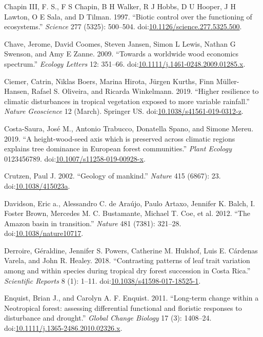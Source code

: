 \documentclass[]{elsarticle} %
\begin{document}
\hypertarget{ref-ChapinIII1997}{}
Chapin III, F. S., F S Chapin, B H Walker, R J Hobbs, D U Hooper, J H
Lawton, O E Sala, and D Tilman. 1997. ``Biotic control over the
functioning of ecosystems.'' \emph{Science} 277 (5325): 500--504.
doi:\href{https://doi.org/10.1126/science.277.5325.500}{10.1126/science.277.5325.500}.

\hypertarget{ref-Chave2009}{}
Chave, Jerome, David Coomes, Steven Jansen, Simon L Lewis, Nathan G
Swenson, and Amy E Zanne. 2009. ``Towards a worldwide wood economics
spectrum.'' \emph{Ecology Letters} 12: 351--66.
doi:\href{https://doi.org/10.1111/j.1461-0248.2009.01285.x}{10.1111/j.1461-0248.2009.01285.x}.

\hypertarget{ref-Ciemer2019}{}
Ciemer, Catrin, Niklas Boers, Marina Hirota, Jürgen Kurths, Finn
Müller-Hansen, Rafael S. Oliveira, and Ricarda Winkelmann. 2019.
``Higher resilience to climatic disturbances in tropical vegetation
exposed to more variable rainfall.'' \emph{Nature Geoscience} 12
(March). Springer US.
doi:\href{https://doi.org/10.1038/s41561-019-0312-z}{10.1038/s41561-019-0312-z}.

\hypertarget{ref-Costa-Saura2019}{}
Costa-Saura, José M., Antonio Trabucco, Donatella Spano, and Simone
Mereu. 2019. ``A height-wood-seed axis which is preserved across
climatic regions explains tree dominance in European forest
communities.'' \emph{Plant Ecology} 0123456789.
doi:\href{https://doi.org/10.1007/s11258-019-00928-x}{10.1007/s11258-019-00928-x}.

\hypertarget{ref-Crutzen2002}{}
Crutzen, Paul J. 2002. ``Geology of mankind.'' \emph{Nature} 415 (6867):
23. doi:\href{https://doi.org/10.1038/415023a}{10.1038/415023a}.

\hypertarget{ref-Davidson2012}{}
Davidson, Eric a., Alessandro C. de Araújo, Paulo Artaxo, Jennifer K.
Balch, I. Foster Brown, Mercedes M. C. Bustamante, Michael T. Coe, et
al. 2012. ``The Amazon basin in transition.'' \emph{Nature} 481 (7381):
321--28.
doi:\href{https://doi.org/10.1038/nature10717}{10.1038/nature10717}.

\hypertarget{ref-Derroire2018}{}
Derroire, Géraldine, Jennifer S. Powers, Catherine M. Hulshof, Luis E.
Cárdenas Varela, and John R. Healey. 2018. ``Contrasting patterns of
leaf trait variation among and within species during tropical dry forest
succession in Costa Rica.'' \emph{Scientific Reports} 8 (1): 1--11.
doi:\href{https://doi.org/10.1038/s41598-017-18525-1}{10.1038/s41598-017-18525-1}.

\hypertarget{ref-Enquist2011}{}
Enquist, Brian J., and Carolyn A. F. Enquist. 2011. ``Long-term change
within a Neotropical forest: assessing differential functional and
floristic responses to disturbance and drought.'' \emph{Global Change
Biology} 17 (3): 1408--24.
doi:\href{https://doi.org/10.1111/j.1365-2486.2010.02326.x}{10.1111/j.1365-2486.2010.02326.x}.
\end{document}
